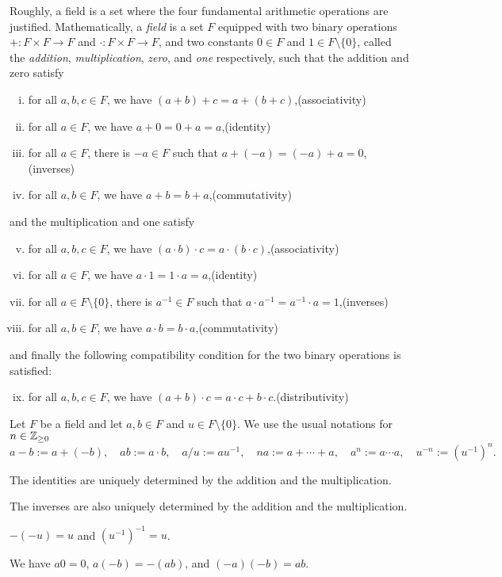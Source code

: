 \documentclass{../../large}
\begin{document}
\begin{prb}[Fields]
Roughly, a field is a set where the four fundamental arithmetic operations are justified.
Mathematically, a \emph{field} is a set $F$ equipped with two binary operations $+:F\times F\to F$ and $\cdot:F\times F\to F$, and two constants $0\in F$ and $1\in F\setminus\{0\}$, called the \emph{addition}, \emph{multiplication}, \emph{zero}, and \emph{one} respectively, such that the addition and zero satisfy
\begin{enumerate}[(i)]
\item for all $a,b,c\in F$, we have $(a+b)+c=a+(b+c)$,\hfill(associativity)
\item for all $a\in F$, we have $a+0=0+a=a$,\hfill(identity)
\item for all $a\in F$, there is $-a\in F$ such that $a+(-a)=(-a)+a=0$,\hfill(inverses)
\item for all $a,b\in F$, we have $a+b=b+a$,\hfill(commutativity)
\end{enumerate}
and the multiplication and one satisfy
\begin{enumerate}[(i)]
\setcounter{enumi}{4}
\item for all $a,b,c\in F$, we have $(a\cdot b)\cdot c=a\cdot(b\cdot c)$,\hfill(associativity)
\item for all $a\in F$, we have $a\cdot 1=1\cdot a=a$,\hfill(identity)
\item for all $a\in F\setminus\{0\}$, there is $a^{-1}\in F$ such that $a\cdot a^{-1}=a^{-1}\cdot a=1$,\hfill(inverses) 
\item for all $a,b\in F$, we have $a\cdot b=b\cdot a$,\hfill(commutativity)
\end{enumerate}
and finally the following compatibility condition for the two binary operations is satisfied:
\begin{enumerate}[(i)]
\setcounter{enumi}{8}
\item for all $a,b,c\in F$, we have $(a+b)\cdot c=a\cdot c+b\cdot c$.\hfill(distributivity)
\end{enumerate}
Let $F$ be a field and let $a,b\in F$ and $u\in F\setminus\{0\}$.
We use the usual notations for $n\in\mathbb{Z}_{\ge0}$
\[a-b:=a+(-b),\quad ab:=a\cdot b,\quad a/u:=au^{-1},\quad na:=a+\cdots+a,\quad a^n:=a\cdots a,\quad u^{-n}:=(u^{-1})^n.\]
\begin{parts}
\item The identities are uniquely determined by the addition and the multiplication.
\item The inverses are also uniquely determined by the addition and the multiplication.
\item $-(-u)=u$ and $(u^{-1})^{-1}=u$.
\item We have $a0=0$, $a(-b)=-(ab)$, and $(-a)(-b)=ab$.
\end{parts}
\end{prb}
\end{document}
